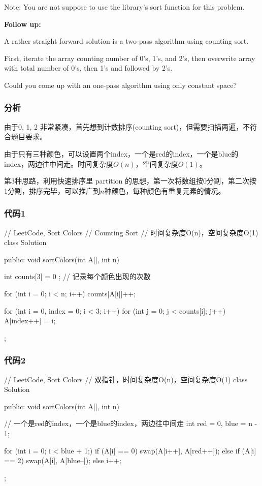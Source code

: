 Note:
You are not suppose to use the library's sort function for this problem.

\textbf{Follow up:}

A rather straight forward solution is a two-pass algorithm using counting sort.

First, iterate the array counting number of 0's, 1's, and 2's, then overwrite array with total number of 0's, then 1's and followed by 2's.

Could you come up with an one-pass algorithm using only constant space?


\subsubsection{分析}
由于0, 1, 2 非常紧凑，首先想到计数排序(counting sort)，但需要扫描两遍，不符合题目要求。

由于只有三种颜色，可以设置两个index，一个是red的index，一个是blue的index，两边往中间走。时间复杂度$O(n)$，空间复杂度$O(1)$。

第3种思路，利用快速排序里 partition 的思想，第一次将数组按0分割，第二次按1分割，排序完毕，可以推广到$n$种颜色，每种颜色有重复元素的情况。


\subsubsection{代码1}
\begin{Code}
// LeetCode, Sort Colors
// Counting Sort
// 时间复杂度O(n)，空间复杂度O(1)
class Solution {
public:
    void sortColors(int A[], int n) {
        int counts[3] = { 0 }; // 记录每个颜色出现的次数

        for (int i = 0; i < n; i++)
            counts[A[i]]++;

        for (int i = 0, index = 0; i < 3; i++)
            for (int j = 0; j < counts[i]; j++)
                A[index++] = i;

    }
};
\end{Code}


\subsubsection{代码2}
\begin{Code}
// LeetCode, Sort Colors
// 双指针，时间复杂度O(n)，空间复杂度O(1)
class Solution {
public:
    void sortColors(int A[], int n) {
        // 一个是red的index，一个是blue的index，两边往中间走
        int red = 0, blue = n - 1;

        for (int i = 0; i < blue + 1;) {
            if (A[i] == 0)
                swap(A[i++], A[red++]);
            else if (A[i] == 2)
                swap(A[i], A[blue--]);
            else
                i++;
        }
    }
};
\end{Code}


